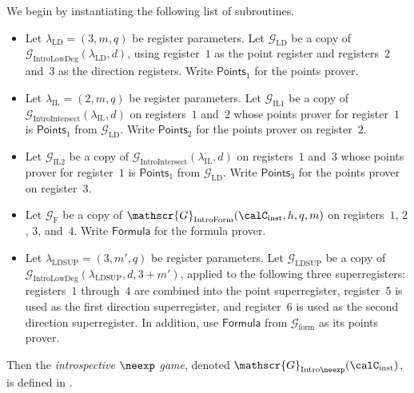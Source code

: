 \documentclass[11pt]{article}
\newcommand{\game}{\mathscr{G}}
\begin{document}
\begin{definition}
We begin by instantiating the following list of subroutines.
\begin{itemize}
\item[$\circ$]
Let $\lambda_{\mathrm{LD}} = (3, m, q)$ be register parameters.
Let $\game_{\mathrm{LD}}$ be a copy of $\game_{\mathrm{IntroLowDeg}}(\lambda_{\mathrm{LD}}, d)$,
	using register~$1$ as the point register and registers~$2$ and~$3$ as the direction registers.
	Write $\mathsf{Points}_1$ for the points prover.
\item[$\circ$]
Let $\lambda_{\mathrm{IL}} = (2, m, q)$ be register parameters.
Let $\game_{\mathrm{IL1}}$ be a copy of $\game_{\mathrm{IntroIntersect}}(\lambda_{\mathrm{IL}}, d)$ on registers~$1$ and~$2$
	whose points prover for register~$1$ is $\mathsf{Points}_1$ from $\game_{\mathrm{LD}}$.
	Write $\mathsf{Points}_2$ for the points prover on register~$2$.
\item[$\circ$] Let $\game_{\mathrm{IL2}}$ be a copy of
	$\game_{\mathrm{IntroIntersect}}(\lambda_{\mathrm{IL}}, d)$ on registers~$1$ and~$3$
	whose points prover for register~$1$ is $\mathsf{Points}_1$ from $\game_{\mathrm{LD}}$.
	Write $\mathsf{Points}_3$ for the points prover on register~$3$.
\item[$\circ$] Let $\game_{\mathrm{F}}$ be a copy of $\game_{\mathrm{IntroForm}}(\calC_{\mathrm{inst}}, h, q, m)$ on registers~$1$, $2$, $3$, and~$4$.
	Write $\mathsf{Formula}$ for the formula prover.
\item[$\circ$]
Let $\lambda_{\mathrm{LDSUP}} = (3, m', q)$ be register parameters.
Let $\game_{\mathrm{LDSUP}}$ be a copy of $\game_{\mathrm{IntroLowDeg}}(\lambda_{\mathrm{LDSUP}}, d, 3+m')$,
applied to the following three superregisters:
registers~$1$ through~$4$ are combined into the point superregister,
register~$5$ is used as the first direction superregister,
and register~$6$ is used as the second direction superregister.
In addition, use $\mathsf{Formula}$ from $\game_{\mathrm{form}}$ as its points prover.
\end{itemize}
Then the \emph{introspective $\neexp$ game}, denoted $\game_{\mathrm{Intro}\neexp}(\calC_{\mathrm{inst}})$, is defined in .
\end{definition}
\end{document}
